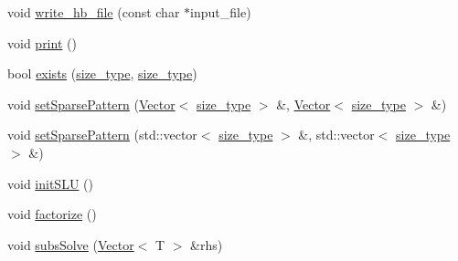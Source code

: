 \begin{DoxyCompactItemize}
\item 
void \hyperlink{classlmx_1_1Type__csc_a9b9007bdd388c37f469496d940be9416}{write\-\_\-hb\-\_\-file} (const char $\ast$input\-\_\-file)
\item 
void \hyperlink{classlmx_1_1Type__csc_aaeb3cfbee5ab97c7eca80812994605f0}{print} ()
\item 
bool \hyperlink{classlmx_1_1Type__csc_af7a2ce6b3c1f7221759e5714be2a6ab2}{exists} (\hyperlink{lmx__mat__data_8h_a49b489a408a211a90e766329c0732d7b}{size\-\_\-type}, \hyperlink{lmx__mat__data_8h_a49b489a408a211a90e766329c0732d7b}{size\-\_\-type})
\item 
void \hyperlink{classlmx_1_1Type__csc_a3a9e534d84a2cf1265adfe87087904b6}{set\-Sparse\-Pattern} (\hyperlink{classlmx_1_1Vector}{Vector}$<$ \hyperlink{lmx__mat__data_8h_a49b489a408a211a90e766329c0732d7b}{size\-\_\-type} $>$ \&, \hyperlink{classlmx_1_1Vector}{Vector}$<$ \hyperlink{lmx__mat__data_8h_a49b489a408a211a90e766329c0732d7b}{size\-\_\-type} $>$ \&)
\item 
void \hyperlink{classlmx_1_1Type__csc_a0d71c07fe7b4ded4eb8c4d70e8e21117}{set\-Sparse\-Pattern} (std\-::vector$<$ \hyperlink{lmx__mat__data_8h_a49b489a408a211a90e766329c0732d7b}{size\-\_\-type} $>$ \&, std\-::vector$<$ \hyperlink{lmx__mat__data_8h_a49b489a408a211a90e766329c0732d7b}{size\-\_\-type} $>$ \&)
\item 
void \hyperlink{classlmx_1_1Type__csc_aded0c22ffd28b30e5e447107fbdb5864}{init\-S\-L\-U} ()
\item 
void \hyperlink{classlmx_1_1Type__csc_acd31af597828197da686efaecc0b2cb7}{factorize} ()
\item 
void \hyperlink{classlmx_1_1Type__csc_a7b4cf55fb69d0bc365e41c47eee0a676}{subs\-Solve} (\hyperlink{classlmx_1_1Vector}{Vector}$<$ T $>$ \&rhs)
\end{DoxyCompactItemize}
